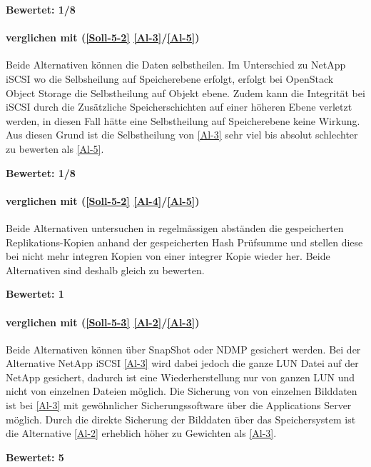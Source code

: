 \textbf{Bewertet: 1/8}

\paragraph*{  verglichen mit  (\ref{Soll-5-2} \ref{Al-3}/\ref{Al-5})}
Beide Alternativen können die Daten selbstheilen. Im Unterschied zu NetApp iSCSI wo die Selbsheilung auf Speicherebene erfolgt, erfolgt bei OpenStack Object Storage die Selbstheilung auf Objekt ebene. Zudem kann die Integrität bei iSCSI durch die Zusätzliche Speicherschichten auf einer höheren Ebene verletzt werden, in diesen Fall hätte eine Selbstheilung auf Speicherebene keine Wirkung. Aus diesen Grund ist die Selbstheilung von  \ref{Al-3} sehr viel bis absolut schlechter zu bewerten als  \ref{Al-5}.

\textbf{Bewertet: 1/8}


\paragraph*{  verglichen mit  (\ref{Soll-5-2} \ref{Al-4}/\ref{Al-5})}
Beide Alternativen untersuchen in regelmässigen abständen die gespeicherten Replikations-Kopien anhand der gespeicherten Hash Prüfsumme und stellen diese bei nicht mehr integren Kopien von einer integrer Kopie wieder her. Beide Alternativen sind deshalb gleich zu bewerten.

\textbf{Bewertet: 1}


\paragraph*{  verglichen mit  (\ref{Soll-5-3} \ref{Al-2}/\ref{Al-3})}
Beide Alternativen können über SnapShot oder NDMP gesichert werden. Bei der Alternative NetApp iSCSI \ref{Al-3} wird dabei jedoch die ganze LUN Datei auf der NetApp gesichert, dadurch ist eine Wiederherstellung nur von ganzen LUN und nicht von einzelnen Dateien möglich. Die Sicherung von von einzelnen Bilddaten ist bei \ref{Al-3} mit gewöhnlicher Sicherungssoftware über die Applications Server möglich.
Durch die direkte Sicherung der Bilddaten über das Speichersystem ist die Alternative  \ref{Al-2} erheblich höher zu Gewichten als  \ref{Al-3}.

\textbf{Bewertet: 5}

